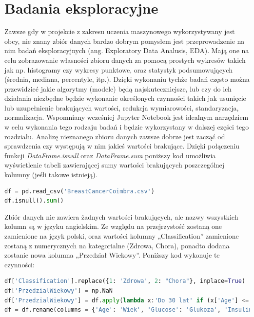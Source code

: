\documentclass[a4paper,12pt,oneside]{book}
\begin{document}
\section{Badania eksploracyjne}
Zawsze gdy w projekcie z zakresu uczenia maszynowego wykorzystywany jest obcy, nie znany zbiór danych bardzo dobrym pomysłem jest przeprowadzenie na nim badań eksploracyjnych (ang. Exploratory Data Analusis, EDA). Mają one na celu zobrazowanie własności zbioru danych za pomocą prostych wykresów takich jak np. histogramy czy wykresy punktowe, oraz statystyk podsumowujących (średnia, mediana, percentyle, itp.). Dzięki wykonaniu tychże badań często można przewidzieć jakie algorytmy (modele) będą najskuteczniejsze, lub czy do ich działania niezbędne będzie wykonanie określonych czynności takich jak usunięcie lub uzupełnienie brakujących wartości, redukcja wymiarowości, standaryzacja, normalizacja.
Wspomniany wcześniej Jupyter Notebook jest idealnym narzędziem w celu wykonania tego rodzaju badań i będzie wykorzystany w dalszej części tego rozdziału. Analizę nieznanego zbioru danych zawsze dobrze jest zacząć od sprawdzenia czy występują w nim jakieś wartości brakujące. Dzięki połączeniu funkcji \textit{DataFrame.isnull} oraz \textit{DataFrame.sum} poniższy kod umożliwia wyświetlenie tabeli zawierającej sumy wartości brakujących poszczególnej kolumny (jeśli takowe istnieją).

\begin{lstlisting}[language=Python, caption=Sumawanie wartości NaN]
df = pd.read_csv('BreastCancerCoimbra.csv')
df.isnull().sum()
\end{lstlisting}



 Zbiór danych nie zawiera żadnych wartości brakujących, ale nazwy wszystkich kolumn są w języku angielskim. Ze względu na przejrzystość zostaną one zamienione na język polski, oraz wartości kolumny „Classification” zamienione zostaną z numerycznych na kategorialne (Zdrowa, Chora), ponadto dodana zostanie nowa kolumna „Przedział Wiekowy”. Poniższy kod wykonuje te czynności:

\begin{lstlisting}[language=Python, caption=Dodawanie nowej cechy]
df['Classification'].replace({1: 'Zdrowa', 2: "Chora"}, inplace=True)
df['PrzedzialWiekowy'] = np.NaN
df['PrzedzialWiekowy'] = df.apply(lambda x:'Do 30 lat' if (x['Age'] <= 30)else '31-50 lat' if (x['Age'] > 30) and (x['Age'] <= 50)else 'Powyzej 50lat', axis=1)
df = df.rename(columns = {'Age': 'Wiek', 'Glucose': 'Glukoza', 'Insulin': 'Insulina','Leptin': 'Leptyna','Adiponectin': 'Adiponektyna','Resistin': 'Rezystyna','MCP-1': 'Bialko chemotaktyczne monocytow','Classification': 'Klasyfikacja'}, inplace = False)
\end{lstlisting}
\end{document}
